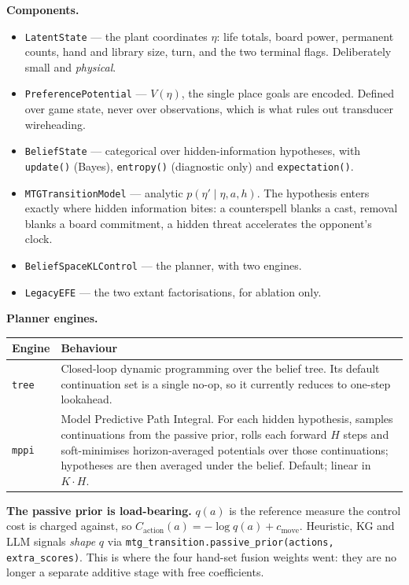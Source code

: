 \documentclass[11pt,a4paper]{article}
\begin{document}
\medskip\noindent\textbf{Components.}
\begin{itemize}[leftmargin=1.2em, itemsep=1pt]
  \item \texttt{LatentState} --- the plant coordinates $\eta$: life totals,
        board power, permanent counts, hand and library size, turn, and the
        two terminal flags. Deliberately small and \emph{physical}.
  \item \texttt{PreferencePotential} --- $V(\eta)$, the single place goals
        are encoded. Defined over game state, never over observations, which
        is what rules out transducer wireheading.
  \item \texttt{BeliefState} --- categorical over hidden-information
        hypotheses, with \texttt{update()} (Bayes), \texttt{entropy()}
        (diagnostic only) and \texttt{expectation()}.
  \item \texttt{MTGTransitionModel} --- analytic $p(\eta' \mid \eta, a, h)$.
        The hypothesis enters exactly where hidden information bites: a
        counterspell blanks a cast, removal blanks a board commitment, a
        hidden threat accelerates the opponent's clock.
  \item \texttt{BeliefSpaceKLControl} --- the planner, with two engines.
  \item \texttt{LegacyEFE} --- the two extant factorisations, for ablation
        only.
\end{itemize}

\medskip\noindent\textbf{Planner engines.}
\begin{center}\small
\begin{tabular}{lp{9cm}}
\toprule
Engine & Behaviour \\
\midrule
\texttt{tree} & Closed-loop dynamic programming over the belief tree.
  Its default continuation set is a single no-op, so it currently reduces
  to one-step lookahead. \\
\texttt{mppi} & Model Predictive Path Integral. For each hidden hypothesis,
  samples continuations from the passive prior, rolls each forward $H$
  steps and soft-minimises horizon-averaged potentials over those
  continuations; hypotheses are then averaged under the belief. Default;
  linear in $K \cdot H$. \\
\bottomrule
\end{tabular}
\end{center}

\medskip\noindent\textbf{The passive prior is load-bearing.} $q(a)$ is the
reference measure the control cost is charged against, so
$C_{\mathrm{action}}(a) = -\log q(a) + c_{\mathrm{move}}$. Heuristic, KG and
LLM signals \emph{shape} $q$ via
\texttt{mtg\_transition.passive\_prior(actions, extra\_scores)}. This is
where the four hand-set fusion weights went: they are no longer a separate
additive stage with free coefficients.
\end{document}
